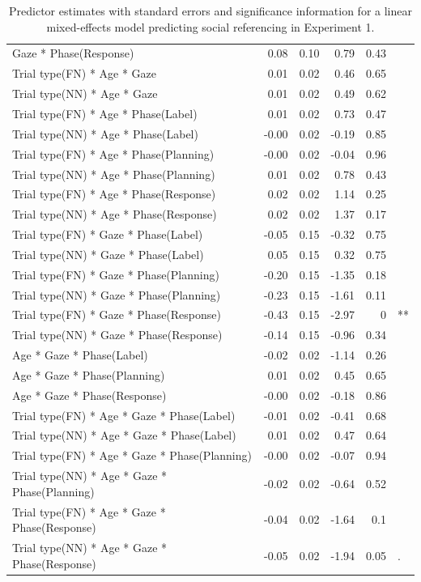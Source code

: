 \documentclass[a4paper,man,apacite,floatsintext]{apa6}
\begin{document}
\begin{table}[tb]
\begin{tabular}{lrrrrl}
  Gaze * Phase(Response) & 0.08 & 0.10 & 0.79 & 0.43 &  \\ 
  Trial type(FN) * Age * Gaze & 0.01 & 0.02 & 0.46 & 0.65 &  \\ 
  Trial type(NN) * Age * Gaze & 0.01 & 0.02 & 0.49 & 0.62 &  \\ 
  Trial type(FN) * Age * Phase(Label) & 0.01 & 0.02 & 0.73 & 0.47 &  \\ 
  Trial type(NN) * Age * Phase(Label) & -0.00 & 0.02 & -0.19 & 0.85 &  \\ 
  Trial type(FN) * Age * Phase(Planning) & -0.00 & 0.02 & -0.04 & 0.96 &  \\ 
  Trial type(NN) * Age * Phase(Planning) & 0.01 & 0.02 & 0.78 & 0.43 &  \\ 
  Trial type(FN) * Age * Phase(Response) & 0.02 & 0.02 & 1.14 & 0.25 &  \\ 
  Trial type(NN) * Age * Phase(Response) & 0.02 & 0.02 & 1.37 & 0.17 &  \\ 
  Trial type(FN) * Gaze * Phase(Label) & -0.05 & 0.15 & -0.32 & 0.75 &  \\ 
  Trial type(NN) * Gaze * Phase(Label) & 0.05 & 0.15 & 0.32 & 0.75 &  \\ 
  Trial type(FN) * Gaze * Phase(Planning) & -0.20 & 0.15 & -1.35 & 0.18 &  \\ 
  Trial type(NN) * Gaze * Phase(Planning) & -0.23 & 0.15 & -1.61 & 0.11 &  \\ 
  Trial type(FN) * Gaze * Phase(Response) & -0.43 & 0.15 & -2.97 & 0 & ** \\ 
  Trial type(NN) * Gaze * Phase(Response) & -0.14 & 0.15 & -0.96 & 0.34 &  \\ 
  Age * Gaze * Phase(Label) & -0.02 & 0.02 & -1.14 & 0.26 &  \\ 
  Age * Gaze * Phase(Planning) & 0.01 & 0.02 & 0.45 & 0.65 &  \\ 
  Age * Gaze * Phase(Response) & -0.00 & 0.02 & -0.18 & 0.86 &  \\ 
  Trial type(FN) * Age * Gaze * Phase(Label) & -0.01 & 0.02 & -0.41 & 0.68 &  \\ 
  Trial type(NN) * Age * Gaze * Phase(Label) & 0.01 & 0.02 & 0.47 & 0.64 &  \\ 
  Trial type(FN) * Age * Gaze * Phase(Planning) & -0.00 & 0.02 & -0.07 & 0.94 &  \\ 
  Trial type(NN) * Age * Gaze * Phase(Planning) & -0.02 & 0.02 & -0.64 & 0.52 &  \\ 
  Trial type(FN) * Age * Gaze * Phase(Response) & -0.04 & 0.02 & -1.64 & 0.1 &  \\ 
  Trial type(NN) * Age * Gaze * Phase(Response) & -0.05 & 0.02 & -1.94 & 0.05 & . \\ 
   \hline
\end{tabular}
\caption{Predictor estimates with standard errors and significance information for a linear mixed-effects model predicting social referencing in Experiment 1.} 
\label{tab:exp2_reg}
\end{table}
\end{document}
